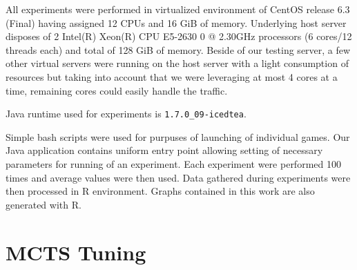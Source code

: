 All experiments were performed in virtualized environment of CentOS release 6.3 (Final) having
assigned 12 CPUs and 16 GiB of memory. Underlying host server disposes of 2 Intel(R) Xeon(R) 
CPU E5-2630 0 @ 2.30GHz processors (6 cores/12 threads each) and total of 128 GiB of memory.
Beside of our testing server, a few other virtual servers were running on the host server with
a light consumption of resources but taking into account that we were leveraging at most 4
cores at a time, remaining cores could easily handle the traffic. 


Java runtime used for experiments is \texttt{1.7.0\_09-icedtea}.

Simple bash scripts were used for purpuses of launching of individual games. Our Java
application contains uniform entry point allowing setting of necessary parameters for running
of an experiment. Each experiment were performed 100 times and average values were then used.
Data gathered during experiments were then processed in R environment. Graphs contained in this
work are also generated with R.


\section{MCTS Tuning}
\label{sec_mcts_tuning}

